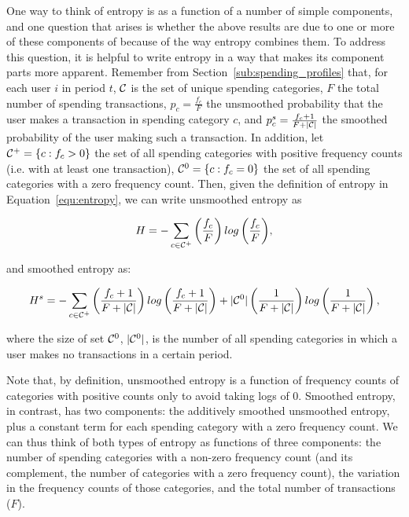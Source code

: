 One way to think of entropy is as a function of a number of simple components,
and one question that arises is whether the above results are due to one or
more of these components of because of the way entropy combines them. To
address this question, it is helpful to write entropy in a way that makes its
component parts more apparent. Remember from
Section~\ref{sub:spending_profiles} that, for each user $i$ in period $t$,
$\mathcal{C}$ is the set of unique spending categories, $F$ the total number of
spending transactions, $p_c = \frac{f_c}{F}$ the unsmoothed probability that
the user makes a transaction in spending category $c$, and $p_c^s = \frac{f_c +
1}{F + |\mathcal{C}|}$ the smoothed probability of the user making such a
transaction. In addition, let $\mathcal{C}^{+} = \{c: f_c > 0\}$ the set of all spending
categories with positive frequency counts (i.e.  with at least one
transaction), $\mathcal{C}^{0} = \{c: f_c = 0\}$ the set of all spending categories with
a zero frequency count. Then, given the definition of entropy in
Equation~\ref{equ:entropy}, we can write unsmoothed entropy as

\begin{equation}
\label{equ:entropy_us}
H = -\sum_{c \in \mathcal{C}^{+}}{\left(\frac{f_c}{F}\right)
log\left(\frac{f_c}{F}\right)},
\end{equation}

and smoothed entropy as:

\begin{equation}
\label{equ:entropy_us}
H^s = -\sum_{c \in \mathcal{C}^{+}}{\left(\frac{f_c + 1}{F + |\mathcal{C}|}\right)
log\left(\frac{f_c + 1}{F + |\mathcal{C}|}\right)}
+ |\mathcal{C}^{0}|\left(\frac{1}{F + |\mathcal{C}|}\right)
log\left(\frac{1}{F + |\mathcal{C}|}\right),
\end{equation}

\noindent where the size of set $\mathcal{C}^{0}$, $|\mathcal{C}^{0}|$, is the number of all
spending categories in which a user makes no transactions in a certain period.

Note that, by definition, unsmoothed entropy is a function of frequency counts
of categories with positive counts only to avoid taking logs of 0. Smoothed
entropy, in contrast, has two components: the additively smoothed unsmoothed
entropy, plus a constant term for each spending category with a zero frequency
count. We can thus think of both types of entropy as functions of three
components: the number of spending categories with a non-zero frequency count
(and its complement, the number of categories with a zero frequency count), the
variation in the frequency counts of those categories, and the total number of
transactions ($F$).

